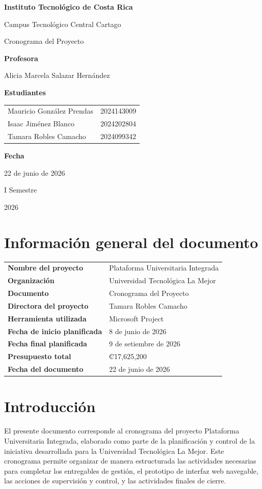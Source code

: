 \documentclass[11pt,spanish]{article}
\title{\DocumentoTitulo}
\author{\AutoresPortada}
\date{\FechaDocumento}
\makeatletter
\newcommand{\Institucion}{Instituto Tecnológico de Costa Rica}
\newcommand{\Campus}{Campus Tecnológico Central Cartago}
\newcommand{\DocumentoTitulo}{Cronograma del Proyecto}
\newcommand{\Profesor}{Alicia Marcela Salazar Hernández}
\newcommand{\FechaDocumento}{22 de junio de 2026}
\newcommand{\PeriodoAcademico}{I Semestre}
\newcommand{\AnioDocumento}{2026}
\newcommand{\AutoresPortada}{%
    \begin{tabular}{l@{\hspace{1.5cm}}r}
        Mauricio González Prendas & 2024143009 \\
        Isaac Jiménez Blanco & 2024202804 \\
        Tamara Robles Camacho & 2024099342 \\
    \end{tabular}%
}
\newcommand{\MakeCover}{%
\begin{titlepage}
\thispagestyle{empty}
\centering

{\bfseries \huge \Institucion \par}
\vspace{0.25cm}
{\LARGE \Campus \par}

\vfill

{\huge \DocumentoTitulo \par}

\vfill

{\bfseries \LARGE Profesora \par}
{\Large \Profesor \par}

\vfill

{\bfseries \LARGE Estudiantes \par}
{\Large \AutoresPortada \par}

\vfill

{\bfseries\LARGE Fecha \par}
{\Large \FechaDocumento \par}

\vfill

{\LARGE \PeriodoAcademico \par}
{\LARGE \AnioDocumento \par}

\end{titlepage}%
}
\makeatother
\begin{document}
\hypersetup{pageanchor=false}

\MakeCover

\pagestyle{empty}
\tableofcontents
\clearpage
{}
\hypersetup{pageanchor=true}
\pagestyle{fancy}

\section{Información general del documento}

\begin{table}[H]
\centering
\begin{tabularx}{\textwidth}{p{5cm} Y}
\toprule
\textbf{Nombre del proyecto} & Plataforma Universitaria Integrada \\
\textbf{Organización} & Universidad Tecnológica La Mejor \\
\textbf{Documento} & \DocumentoTitulo \\
\textbf{Directora del proyecto} & Tamara Robles Camacho \\
\textbf{Herramienta utilizada} & Microsoft Project \\
\textbf{Fecha de inicio planificada} & 8 de junio de 2026 \\
\textbf{Fecha final planificada} & 9 de setiembre de 2026 \\
\textbf{Presupuesto total} & ₡17,625,200 \\
\textbf{Fecha del documento} & \FechaDocumento \\
\bottomrule
\end{tabularx}
\end{table}

\section{Introducción}

El presente documento corresponde al cronograma del proyecto Plataforma Universitaria Integrada, elaborado como parte de la planificación y control de la iniciativa desarrollada para la Universidad Tecnológica La Mejor. Este cronograma permite organizar de manera estructurada las actividades necesarias para completar los entregables de gestión, el prototipo de interfaz web navegable, las acciones de supervisión y control, y las actividades finales de cierre.
\end{document}
